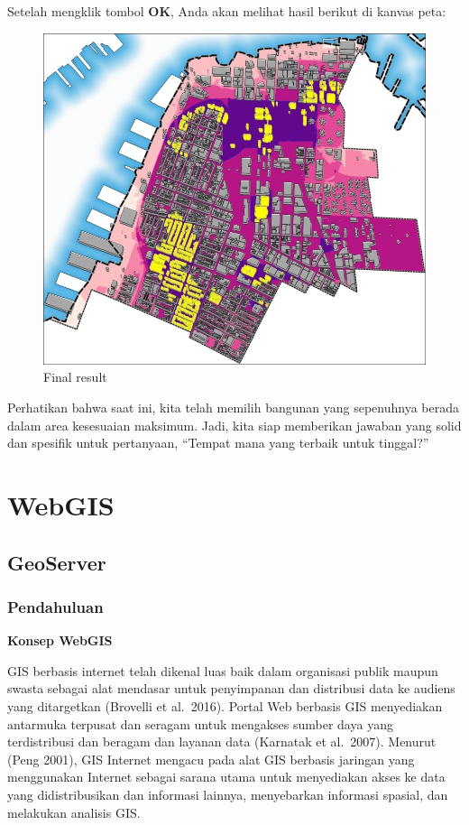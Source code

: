 \documentclass[]{book}
\begin{document}
Setelah mengklik tombol \textbf{OK}, Anda akan melihat hasil berikut di kanvas peta:

\begin{figure}

{\centering \includegraphics[width=0.7\linewidth]{images/04/fig49} 

}

\caption{Final result}\label{fig:fig1449}
\end{figure}

Perhatikan bahwa saat ini, kita telah memilih bangunan yang sepenuhnya berada dalam area kesesuaian maksimum. Jadi, kita siap memberikan jawaban yang solid dan spesifik untuk pertanyaan, ``Tempat mana yang terbaik untuk tinggal?''

\hypertarget{part-webgis}{%
\part{WebGIS}\label{part-webgis}}

\hypertarget{geoserver}{%
\chapter{GeoServer}\label{geoserver}}

\hypertarget{pendahuluan}{%
\section{Pendahuluan}\label{pendahuluan}}

\textbf{Konsep WebGIS}

GIS berbasis internet telah dikenal luas baik dalam organisasi publik maupun swasta sebagai alat mendasar untuk penyimpanan dan distribusi data ke audiens yang ditargetkan (Brovelli et al.~2016). Portal Web berbasis GIS menyediakan antarmuka terpusat dan seragam untuk mengakses sumber daya yang terdistribusi dan beragam dan layanan data (Karnatak et al.~2007). Menurut (Peng 2001), GIS Internet mengacu pada alat GIS berbasis jaringan yang menggunakan Internet sebagai sarana utama untuk menyediakan akses ke data yang didistribusikan dan informasi lainnya, menyebarkan informasi spasial, dan melakukan analisis GIS.
\end{document}
